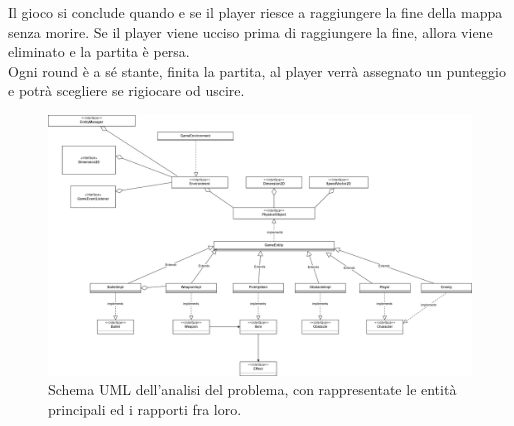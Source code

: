\textsf{\small Il gioco si conclude quando e se il player riesce a raggiungere la fine della mappa senza morire.}
\textsf{\small Se il player viene ucciso prima di raggiungere la fine, allora viene eliminato e la partita è persa.}\\

\textsf{\small Ogni round è a sé stante, finita la partita, al player verrà assegnato un punteggio e potrà scegliere se rigiocare od uscire.}\\


	\begin{figure}[h]
		\centering{}
		\includegraphics[width=1.2\linewidth]{./img/model.png}
		\caption{Schema UML dell'analisi del problema, con rappresentate le entità principali ed i rapporti fra loro.}
		\label{img:analysis}
	\end{figure}
